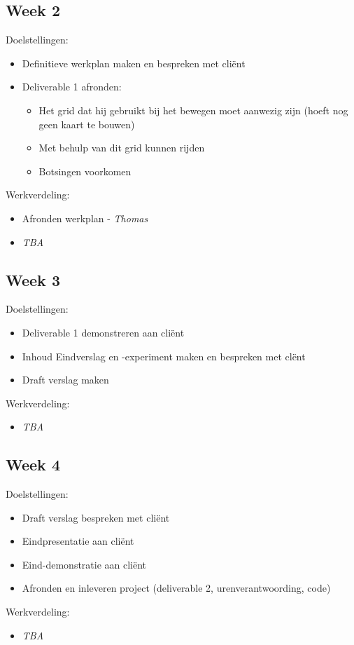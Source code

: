 \documentclass[a4paper, 11pt]{article}
\begin{document}
  \subsection*{Week 2}
    Doelstellingen:
    \begin{itemize}
	\item Definitieve werkplan maken en bespreken met cli\"ent
        \item Deliverable 1 afronden:
          \begin{itemize}
           \item Het grid dat hij gebruikt bij het bewegen moet aanwezig zijn (hoeft nog geen kaart te bouwen)
           \item Met behulp van dit grid kunnen rijden
           \item Botsingen voorkomen
          \end{itemize}
    \end{itemize}
    Werkverdeling:
    \begin{itemize}
        \item Afronden werkplan - \emph{Thomas}
        \item  \emph{TBA}
    \end{itemize}
    
  \subsection*{Week 3}
    Doelstellingen:
    \begin{itemize}
        \item Deliverable 1 demonstreren aan cli\"ent
        \item Inhoud Eindverslag en -experiment maken en bespreken met cl\"ent
        \item Draft verslag maken
    \end{itemize}
    Werkverdeling:
    \begin{itemize}
        \item \emph{TBA}
    \end{itemize}

  \subsection*{Week 4}
    Doelstellingen:
    \begin{itemize}
        \item Draft verslag bespreken met cli\"ent
        \item Eindpresentatie aan cli\"ent
        \item Eind-demonstratie aan cli\"ent
        \item Afronden en inleveren project (deliverable 2, urenverantwoording, code)
    \end{itemize}
    Werkverdeling:
    \begin{itemize}
        \item \emph{TBA}\\\\
    \end{itemize}
    
\end{document}
